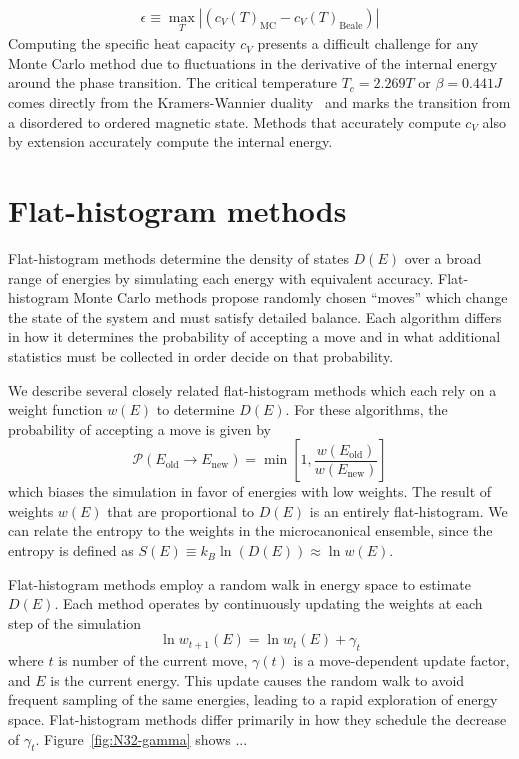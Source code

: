 \begin{align}
\epsilon \equiv \max_T \left|\left(c_V(T)_{\text{MC}} - c_V(T)_{\text{Beale}}\right)\right|
\end{align}
Computing the specific heat capacity $c_V$ presents a difficult challenge for
any Monte Carlo method due to fluctuations in the derivative of the
internal energy around the phase transition. The critical temperature $T_c = 2.
269T$ or $\beta= 0.441J$ comes directly from the Kramers-Wannier
duality~\cite{bhattacharjee1995fifty} and marks the transition from a
disordered to ordered magnetic state. Methods that accurately compute $c_V$
also by extension accurately compute the internal energy.

\section{Flat-histogram methods}\label{sec:histogram}
Flat-histogram methods determine the density of states $D(E)$ over a broad range
of energies by simulating each energy with equivalent accuracy. Flat-histogram
Monte Carlo methods propose randomly chosen ``moves'' which change the state of
the system and must satisfy detailed balance.  Each algorithm differs in how it
determines the probability of accepting a move and in what additional statistics
must be collected in order decide on that probability.

We describe several closely related flat-histogram methods which each rely on a
weight function $w(E)$ to determine $D(E)$.  For these algorithms, the
probability of accepting a move is given by
\begin{equation}
	\mathcal{P}(E_\text{old} \rightarrow E_\text{new})
	= \min\left[1,\frac{w(E_\text{old})}{w(E_\text{new})}\right]
\end{equation}
which biases the simulation in favor of energies with low weights. The result of
weights $w(E)$ that are proportional to $D(E)$ is an entirely flat-histogram. We
can relate the entropy to the weights in the microcanonical ensemble, since the
entropy is defined as $S(E) \equiv k_B\ln(D(E)) \approx \ln w(E)$.

Flat-histogram methods employ a random walk in energy space to estimate $D(E)$.  Each method operates by continuously updating the weights at each
step of the simulation
\begin{equation}
	\ln{w_{t+1}(E)}=\ln{w_{t}(E)}
	+\gamma_t
\end{equation}
where $t$ is number of the current move, $\gamma(t)$ is a move-dependent update
factor, and $E$ is the current energy.  This update causes the random walk to
avoid frequent sampling of the same energies, leading to a rapid exploration
of energy space. Flat-histogram methods differ primarily in how they schedule
the decrease of $\gamma_t$.  Figure~\ref{fig:N32-gamma} shows ...

